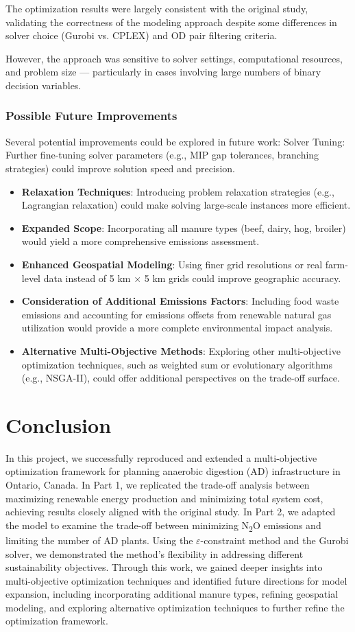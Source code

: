 \documentclass[12pt]{article}
\begin{document}
The optimization results were largely consistent with the original study, validating the correctness of the modeling approach despite some differences in solver choice (Gurobi vs. CPLEX) and OD pair filtering criteria.

However, the approach was sensitive to solver settings, computational resources, and problem size — particularly in cases involving large numbers of binary decision variables.

\subsubsection{Possible Future Improvements}
Several potential improvements could be explored in future work:
Solver Tuning: Further fine-tuning solver parameters (e.g., MIP gap tolerances, branching strategies) could improve solution speed and precision.
\begin{itemize}
  \item \textbf{Relaxation Techniques}: Introducing problem relaxation strategies (e.g., Lagrangian relaxation) could make solving large-scale instances more efficient.
  \item \textbf{Expanded Scope}: Incorporating all manure types (beef, dairy, hog, broiler) would yield a more comprehensive emissions assessment.
  \item \textbf{Enhanced Geospatial Modeling}: Using finer grid resolutions or real farm-level data instead of 5 km × 5 km grids could improve geographic accuracy.
  \item \textbf{Consideration of Additional Emissions Factors}: Including food waste emissions and accounting for emissions offsets from renewable natural gas utilization would provide a more complete environmental impact analysis.
  \item \textbf{Alternative Multi-Objective Methods}: Exploring other multi-objective optimization techniques, such as weighted sum or evolutionary algorithms (e.g., NSGA-II), could offer additional perspectives on the trade-off surface.
\end{itemize}


\section{Conclusion}
In this project, we successfully reproduced and extended a multi-objective optimization framework for planning anaerobic digestion (AD) infrastructure in Ontario, Canada. In Part 1, we replicated the trade-off analysis between maximizing renewable energy production and minimizing total system cost, achieving results closely aligned with the original study. In Part 2, we adapted the model to examine the trade-off between minimizing N\textsubscript{2}O emissions and limiting the number of AD plants. Using the $\varepsilon$-constraint method and the Gurobi solver, we demonstrated the method's flexibility in addressing different sustainability objectives. Through this work, we gained deeper insights into multi-objective optimization techniques and identified future directions for model expansion, including incorporating additional manure types, refining geospatial modeling, and exploring alternative optimization techniques to further refine the optimization framework.
\end{document}
